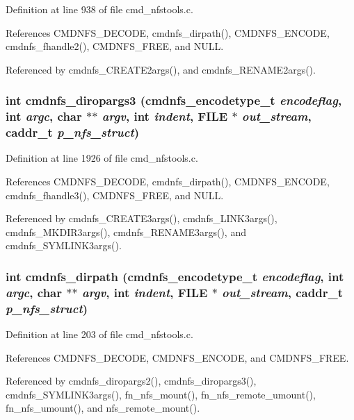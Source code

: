 Definition at line 938 of file cmd\_\-nfstools.c.

References CMDNFS\_\-DECODE, cmdnfs\_\-dirpath(), CMDNFS\_\-ENCODE, cmdnfs\_\-fhandle2(), CMDNFS\_\-FREE, and NULL.

Referenced by cmdnfs\_\-CREATE2args(), and cmdnfs\_\-RENAME2args().
\subsubsection{\setlength{\rightskip}{0pt plus 5cm}int cmdnfs\_\-diropargs3 ({\bf cmdnfs\_\-encodetype\_\-t} {\em encodeflag}, int {\em argc}, char $\ast$$\ast$ {\em argv}, int {\em indent}, FILE $\ast$ {\em out\_\-stream}, caddr\_\-t {\em p\_\-nfs\_\-struct})}\label{cmd__nfstools_8c_a85}




Definition at line 1926 of file cmd\_\-nfstools.c.

References CMDNFS\_\-DECODE, cmdnfs\_\-dirpath(), CMDNFS\_\-ENCODE, cmdnfs\_\-fhandle3(), CMDNFS\_\-FREE, and NULL.

Referenced by cmdnfs\_\-CREATE3args(), cmdnfs\_\-LINK3args(), cmdnfs\_\-MKDIR3args(), cmdnfs\_\-RENAME3args(), and cmdnfs\_\-SYMLINK3args().
\subsubsection{\setlength{\rightskip}{0pt plus 5cm}int cmdnfs\_\-dirpath ({\bf cmdnfs\_\-encodetype\_\-t} {\em encodeflag}, int {\em argc}, char $\ast$$\ast$ {\em argv}, int {\em indent}, FILE $\ast$ {\em out\_\-stream}, caddr\_\-t {\em p\_\-nfs\_\-struct})}\label{cmd__nfstools_8c_a60}




Definition at line 203 of file cmd\_\-nfstools.c.

References CMDNFS\_\-DECODE, CMDNFS\_\-ENCODE, and CMDNFS\_\-FREE.

Referenced by cmdnfs\_\-diropargs2(), cmdnfs\_\-diropargs3(), cmdnfs\_\-SYMLINK3args(), fn\_\-nfs\_\-mount(), fn\_\-nfs\_\-remote\_\-umount(), fn\_\-nfs\_\-umount(), and nfs\_\-remote\_\-mount().
